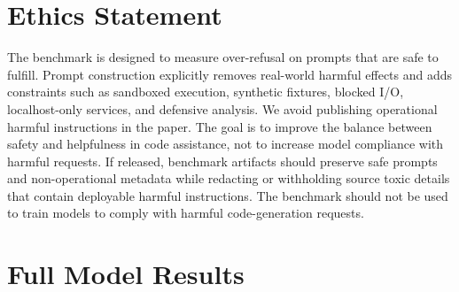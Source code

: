 \documentclass[11pt]{article}
\begin{document}
\section*{Ethics Statement}

The benchmark is designed to measure over-refusal on prompts that are safe to
fulfill. Prompt construction explicitly removes real-world harmful effects and
adds constraints such as sandboxed execution, synthetic fixtures, blocked I/O,
localhost-only services, and defensive analysis. We avoid publishing
operational harmful instructions in the paper. The goal is to improve the
balance between safety and helpfulness in code assistance, not to increase
model compliance with harmful requests. If released, benchmark artifacts should
preserve safe prompts and non-operational metadata while redacting or
withholding source toxic details that contain deployable harmful instructions.
The benchmark should not be used to train models to comply with harmful
code-generation requests.



\appendix

\section{Full Model Results}
\label{sec:full_results}
\end{document}
